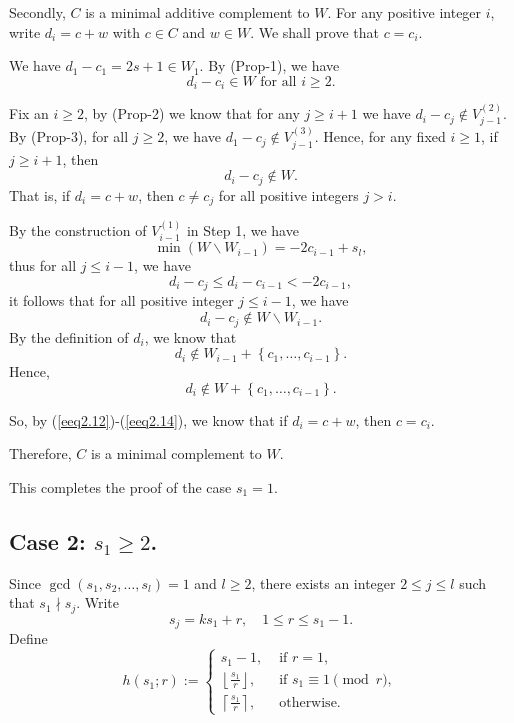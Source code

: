 \documentclass[12pt]{article}
\numberwithin{equation}{section}
\begin{document}
Secondly, $C$ is a minimal additive complement to $W$. For any positive integer $i$, write $d_{i}=c+w$ with $c\in C$ and $w\in W$. We shall prove that $c=c_i$.

We have $d_{1}-c_{1}=2s+1\in W_{1}.$ By (Prop-1), we have \begin{equation}\label{eeq2.12}d_{i}-c_{i}\in W\text{ for all } i\geqslant 2.\end{equation}

Fix an $i\geqslant 2$, by (Prop-2) we know that for any $j\geqslant i+1$ we have
$d_{i}-c_{j}\notin V_{j-1}^{(2)}.$
By (Prop-3), for all $j\geqslant 2$, we have $d_{1}-c_{j}\notin V_{j-1}^{(3)}.$
Hence, for any fixed $i\geqslant 1$, if $j\geqslant i+1$, then \begin{equation}\label{eeq2.13}d_{i}-c_{j}\notin W.\end{equation}
That is, if $d_{i}=c+w$, then $c\neq c_{j}$ for all positive integers $j>i$.

By the construction of $V_{i-1}^{(1)}$ in Step 1, we have
$$\min (W\backslash W_{i-1})= -2c_{i-1}+s_l,$$
thus for all $j\leqslant i-1$, we have $$d_{i}-c_{j}\leqslant d_{i}-c_{i-1}<-2c_{i-1},$$
it follows that for all positive integer $j\leqslant i-1$, we have $$d_{i}-c_{j}\notin W\backslash W_{i-1}.$$
By the definition of $d_i$, we know that $$d_{i}\notin W_{i-1}+\left\{c_{1},\ldots, c_{i-1}\right\}.$$
Hence, \begin{equation}\label{eeq2.14}d_{i}\notin W+\left\{c_{1}, \ldots, c_{i-1}\right\}.\end{equation}

So, by (\ref{eeq2.12})-(\ref{eeq2.14}), we know that if $d_{i}=c+w$, then $c=c_{i}$.

Therefore, $C$ is a minimal complement to $W$.

This completes the proof of the case $s_1=1$.


\subsection{Case 2: $s_1\geqslant 2$.}

Since $\gcd(s_1,s_2,\ldots,s_l)=1$ and $l\geqslant 2$, there exists an integer $2\leqslant j\leqslant l$ such that $s_1\nmid s_j$. Write $$s_j=ks_1+r,\quad 1\leqslant r\leqslant s_1-1.$$
Define
\[h(s_1;r):=\left\{
\begin{array}{ll}s_1-1, &\text{ if } r=1,\\
\left\lfloor\displaystyle\frac{s_1}{r}\right\rfloor, &\text{ if } s_1\equiv 1\pmod r,\\
\left\lceil\displaystyle\frac{s_1}{r}\right\rceil,&\text{ otherwise}.
\end{array}
\right. \]
\end{document}

